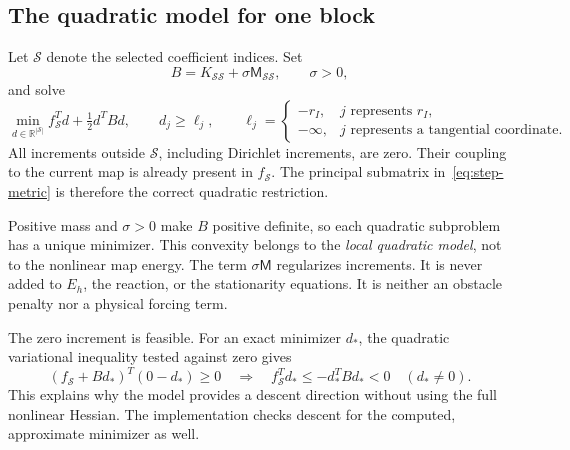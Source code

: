 \documentclass[11pt,a4paper]{article}
\newcommand{\R}{\mathbb R}
\begin{document}
\subsection{The quadratic model for one block}
Let \(\mathcal S\) denote the selected coefficient indices. Set
\begin{equation}
 B=K_{\mathcal S\mathcal S}+\sigma\mathsf M_{\mathcal S\mathcal S},
 \qquad \sigma>0,
 \label{eq:step-metric}
\end{equation}
and solve
\begin{equation}
 \min_{d\in\R^{|\mathcal S|}}
 f_{\mathcal S}^{T}d+\tfrac12d^TBd,
 \qquad
 d_j\geq\ell_j,\qquad
 \ell_j=\begin{cases}-r_I,&j\text{ represents }r_I,\\
 -\infty,&j\text{ represents a tangential coordinate}.
 \end{cases}
 \label{eq:qp}
\end{equation}
All increments outside \(\mathcal S\), including Dirichlet increments,
are zero. Their coupling to the current map is already present in
\(f_{\mathcal S}\). The principal submatrix in~\eqref{eq:step-metric}
is therefore the correct quadratic restriction.

Positive mass and \(\sigma>0\) make \(B\) positive definite, so each
quadratic subproblem has a unique minimizer. This convexity belongs to the
\emph{local quadratic model}, not to the nonlinear map energy.
The term \(\sigma\mathsf M\) regularizes increments. It is never added to
\(E_h\), the reaction, or the stationarity equations. It is neither an
obstacle penalty nor a physical forcing term.

The zero increment is feasible. For an exact minimizer \(d_*\), the
quadratic variational inequality tested against zero gives
\begin{equation}
 (f_{\mathcal S}+Bd_*)^T(0-d_*)\geq0
 \quad\Longrightarrow\quad
 f_{\mathcal S}^Td_*\leq-d_*^TBd_*<0\quad(d_*\ne0).
 \label{eq:descent}
\end{equation}
This explains why the model provides a descent direction without using
the full nonlinear Hessian. The implementation checks descent for the
computed, approximate minimizer as well.
\end{document}
